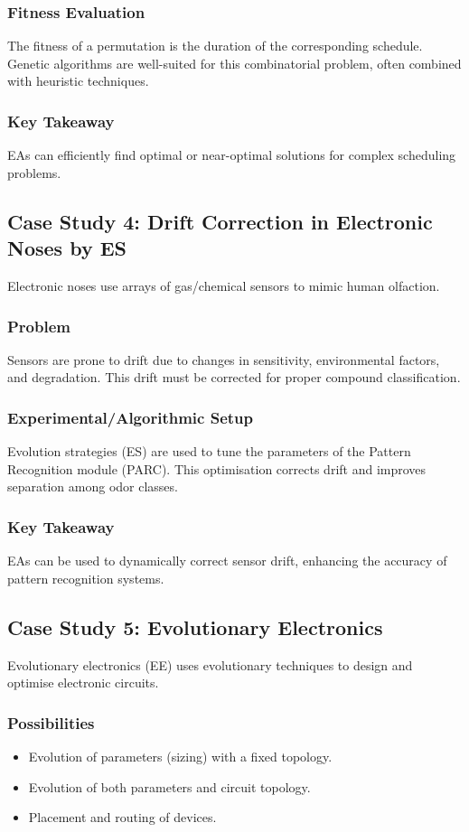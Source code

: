 \subsubsection*{Fitness Evaluation}
The fitness of a permutation is the duration of the corresponding schedule. Genetic algorithms are well-suited for this combinatorial problem, often combined with heuristic techniques.
\subsubsection*{Key Takeaway}
EAs can efficiently find optimal or near-optimal solutions for complex scheduling problems.

\subsection*{Case Study 4: Drift Correction in Electronic Noses by ES}
Electronic noses use arrays of gas/chemical sensors to mimic human olfaction.
\subsubsection*{Problem}
Sensors are prone to drift due to changes in sensitivity, environmental factors, and degradation. This drift must be corrected for proper compound classification.
\subsubsection*{Experimental/Algorithmic Setup}
Evolution strategies (ES) are used to tune the parameters of the Pattern Recognition module (PARC). This optimisation corrects drift and improves separation among odor classes.
\subsubsection*{Key Takeaway}
EAs can be used to dynamically correct sensor drift, enhancing the accuracy of pattern recognition systems.

\subsection*{Case Study 5: Evolutionary Electronics}
Evolutionary electronics (EE) uses evolutionary techniques to design and optimise electronic circuits.
\subsubsection*{Possibilities}
\begin{itemize}
    \item Evolution of parameters (sizing) with a fixed topology.
    \item Evolution of both parameters and circuit topology.
    \item Placement and routing of devices.
\end{itemize}
